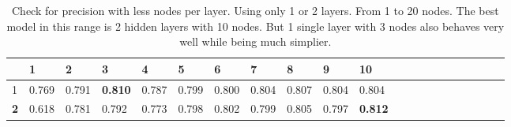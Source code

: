 \documentclass{article}
\begin{document}
\begin{center}
\begin{table}[]
\caption{Check for precision with less nodes per layer. Using only 1 or 2 layers. From 1 to 20 nodes. The best model in this range is 2 hidden layers with 10 nodes. But 1 single layer with 3 nodes also behaves very well while being much simplier.}
\label{tab:NN-LessNodesPerLayer}
\begin{tabular}{|l|l|l|l|l|l|l|l|l|l|l|l|l|l|l|l|l|l|l|l|l|}
\hline\
    & 1     & 2     & 3              & 4     & 5     & 6     & 7     & 8     & 9     & \textbf{10}  \\ \hline
1          & 0.769 & 0.791 & \textbf{0.810} & 0.787 & 0.799 & 0.800 & 0.804 & 0.807 & 0.804 & 0.804 \\ \hline
\textbf{2} & 0.618 & 0.781 & 0.792          & 0.773 & 0.798 & 0.802 & 0.799 & 0.805 & 0.797 & \textbf{0.812} \\ \hline
\end{tabular}
\end{table}
\end{center}
 
\end{document}

